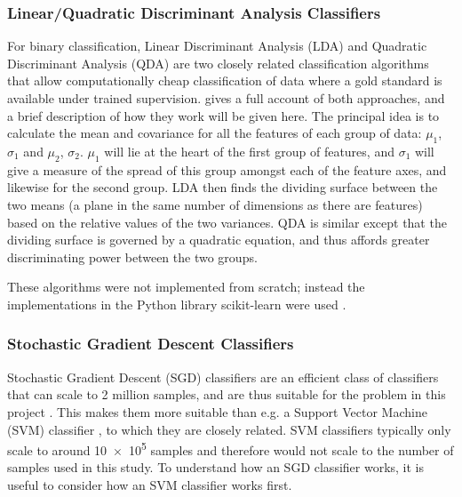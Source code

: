 \documentclass[pdftex,12pt,a4paper]{report}
\begin{document}

\subsubsection{Linear/Quadratic Discriminant Analysis Classifiers}

For binary classification, Linear Discriminant Analysis (LDA) and Quadratic Discriminant Analysis
(QDA) are two closely related classification algorithms that allow computationally cheap
classification of data where a gold standard is available under trained supervision.
\textcite{mclachlan2004discriminant} gives a full account of both approaches, and a brief description of how they
work will be given here. The principal idea is to calculate the mean and covariance for all the
features of each group of data: $\mu_1$, $\sigma_1$ and $\mu_2$, $\sigma_2$. $\mu_1$ will lie at the
heart of the first group of features, and $\sigma_1$ will give a measure of the spread of this group
amongst each of the feature axes, and likewise for the second group. LDA then finds the dividing
surface between the two means (a plane in the same number of dimensions as there are features) based
on the relative values of the two variances. QDA is similar except that the dividing surface is
governed by a quadratic equation, and thus affords greater discriminating power between the two
groups.

These algorithms were not implemented from scratch; instead the implementations in the Python
library scikit-learn were used \parencite{scikitLearn2011}.

\subsubsection{Stochastic Gradient Descent Classifiers}
Stochastic Gradient Descent (SGD) classifiers are an efficient class of classifiers that can scale
to 2 million samples, and are thus suitable for the problem in this project
\parencite{singer07pegasos, bottou2008tradeoffs}. This makes them more suitable than e.g. a Support
Vector Machine (SVM) classifier \parencite{cortes1995support}, to which they are closely related.
SVM classifiers typically only scale to around \SI{10e5}{} samples and therefore would not scale to
the number of samples used in this study. To understand how an SGD classifier works, it is useful to
consider how an SVM classifier works first.
\end{document}
